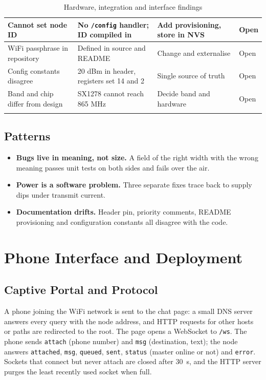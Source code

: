 \documentclass{tietreport}
\begin{document}
{\begin{longtable}{|p{1.3in}|p{1.65in}|p{1.7in}|p{0.7in}|}
  \hline
  Cannot set node ID &
  No \texttt{/config} handler; ID compiled in &
  Add provisioning, store in NVS & Open \\
  \hline
  WiFi passphrase in repository &
  Defined in source and README &
  Change and externalise & Open \\
  \hline
  Config constants disagree &
  20 dBm in header, registers set 14 and 2 &
  Single source of truth & Open \\
  \hline
  Band and chip differ from design &
  SX1278 cannot reach 865 MHz &
  Decide band and hardware & Open \\
  \hline
\caption{Hardware, integration and interface findings}
\end{longtable}
}

\section{Patterns}

\begin{itemize}
  \item \textbf{Bugs live in meaning, not size.} A field of the right
    width with the wrong meaning passes unit tests on both sides and
    fails over the air.
  \item \textbf{Power is a software problem.} Three separate fixes
    trace back to supply dips under transmit current.
  \item \textbf{Documentation drifts.} Header pin, priority comments,
    README provisioning and configuration constants all disagree with
    the code.
\end{itemize}

\chapter{Phone Interface and Deployment}

\section{Captive Portal and Protocol}

A phone joining the WiFi network is sent to the chat page: a small DNS
server answers every query with the node address, and HTTP requests
for other hosts or paths are redirected to the root. The page opens a
WebSocket to \texttt{/ws}. The phone sends \texttt{attach} (phone
number) and \texttt{msg} (destination, text); the node answers
\texttt{attached}, \texttt{msg}, \texttt{queued}, \texttt{sent},
\texttt{status} (master online or not) and \texttt{error}. Sockets that
connect but never attach are closed after 30~s, and the HTTP server
purges the least recently used socket when full.
\end{document}
